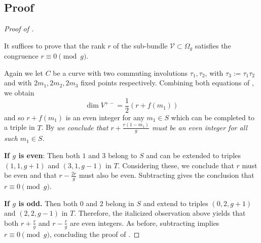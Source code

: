 \documentclass[reqno]{amsart}
\theoremstyle{plain}
\newcommand{\V}{\mathscr{V}}
\newcommand{\Hodge}{\Omega}
\begin{document}
\subsection{Proof}

\begin{proof} [Proof of ]
  \label{proof:main} 

  It suffices to prove that the rank $r$ of the sub-bundle $\V \subset
  \Hodge_{g}$ satisfies the congruence $r \equiv 0 \pmod g$. 

  Again we let $C$ be a curve with two commuting involutions
  $\tau_1, \tau_2$, with $\tau_3 := \tau_1 \tau_2$ and with $2m_1, 2m_2, 2m_3$ fixed
  points respectively.  Combining both equations of
  , we obtain 
  \[\dim V^{+-} = \frac{1}{2}(r + f(m_1))\] and so $r+f(m_1)$ is an even
  integer for any $m_1 \in S$ which can be completed to a triple in $T$.  By
   \textit{we conclude that $r + \frac{r(1-m_1)}{g}$ must
  be an even integer for all such $m_{1} \in S$.} 


  \textbf{If $g$ is even}: Then both $1$ and $3$ belong to $S$ and can be
  extended to triples $(1,1,g+1)$ and $(3,1,g-1)$ in $T$. Considering these, we
  conclude that $r$ must be even and that $r- \frac{2r}{g}$ must also be even.
  Subtracting gives the conclusion that $r \equiv 0 \pmod g$. 

  \textbf{If $g$ is odd.} Then both $0$ and $2$ belong in $S$ and extend to
  triples $(0,2,g+1)$ and $(2,2,g-1)$ in $T$. Therefore, the italicized
  observation above yields that both $r + \frac{r}{g}$ and $r -\frac{r}{g}$ are
  even integers.  As before, subtracting implies $r \equiv 0 \pmod g$, concluding
  the proof of .
\end{proof}




\end{document}
